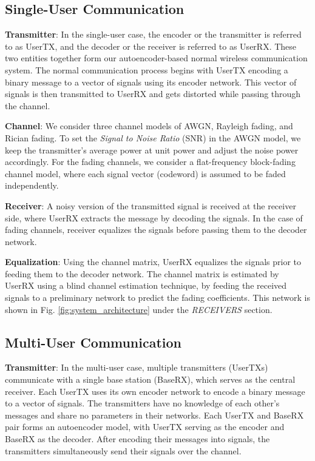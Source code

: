 \subsection{Single-User Communication}
\textbf{Transmitter}: In the single-user case, the encoder or the transmitter is referred to as UserTX, and the decoder or the receiver is referred to as UserRX. These two entities together form our autoencoder-based normal wireless communication system. The normal communication process begins with UserTX encoding a binary message to a vector of signals using its encoder network. This vector of signals is then transmitted to UserRX and gets distorted while passing through the channel.

\textbf{Channel}: We consider three channel models of AWGN, Rayleigh fading, and Rician fading. To set the \textit{Signal to Noise Ratio} (SNR) in the AWGN model, we keep the transmitter's average power at unit power and adjust the noise power accordingly. For the fading channels, we consider a flat-frequency block-fading channel model, where each signal vector (codeword) is assumed to be faded independently.

\textbf{Receiver}: A noisy version of the transmitted signal is received at the receiver side, where UserRX extracts the message by decoding the signals. In the case of fading channels, receiver equalizes the signals before passing them to the decoder network.

\textbf{Equalization}: Using the channel matrix, UserRX equalizes the signals prior to feeding them to the decoder network. The channel matrix is estimated by UserRX using a blind channel estimation technique, by feeding the received signals to a preliminary network to predict the fading coefficients. This network is shown in Fig. \ref{fig:system_architecture} under the \textit{RECEIVERS} section.

\subsection{Multi-User Communication}
\textbf{Transmitter}: In the multi-user case, multiple transmitters (UserTXs) communicate with a single base station (BaseRX), which serves as the central receiver. Each UserTX uses its own encoder network to encode a binary message to a vector of signals. The transmitters have no knowledge of each other's messages and share no parameters in their networks. Each UserTX and BaseRX pair forms an autoencoder model, with UserTX serving as the encoder and BaseRX as the decoder. After encoding their messages into signals, the transmitters simultaneously send their signals over the channel.

